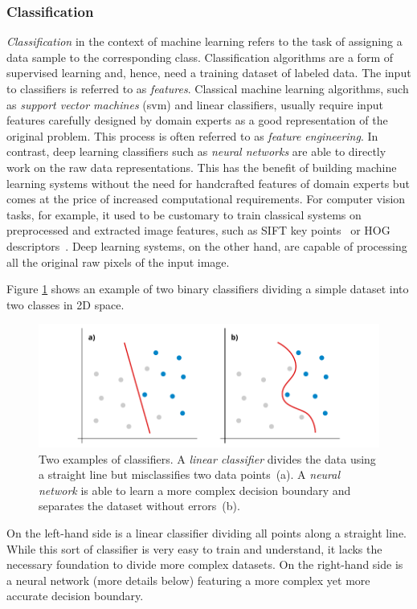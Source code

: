 \subsubsection{Classification}
\emph{Classification} in the context of machine learning refers to the task of assigning a data sample to the corresponding class. Classification algorithms are a form of supervised learning and, hence, need a training dataset of labeled data. The input to classifiers is referred to as \emph{features}. Classical machine learning algorithms, such as \emph{support vector machines} (\ac{svm}) and linear classifiers, usually require input features carefully designed by domain experts as a good representation of the original problem. This process is often referred to as \emph{feature engineering}. In contrast, deep learning classifiers such as \emph{neural networks} are able to directly work on the raw data representations. This has the benefit of building machine learning systems without the need for handcrafted features of domain experts but comes at the price of increased computational requirements. For computer vision tasks, for example, it used to be customary to train classical systems on preprocessed and extracted image features, such as SIFT key points~\cite{lowe1999object} or HOG descriptors~\cite{dalal2005histograms}. Deep learning systems, on the other hand, are capable of processing all the original raw pixels of the input image.


Figure \ref{fig:classifiers} shows an example of two binary classifiers dividing a simple dataset into two classes in 2D space.
%
	\begin{figure}[tp]
  		\centering
    	\includegraphics{img/classifiers.pdf}
    	\caption{Two examples of classifiers. A \emph{linear classifier} divides the data using a straight line but misclassifies two data points~(a). A \emph{neural network} is able to learn a more complex decision boundary and separates the dataset without errors~(b).}
    	\label{fig:classifiers}
	\end{figure}
%
On the left-hand side is a linear classifier dividing all points along a straight line. While this sort of classifier is very easy to train and understand, it lacks the necessary foundation to divide more complex datasets. On the right-hand side is a neural network (more details below) featuring a more complex yet more accurate decision boundary.


